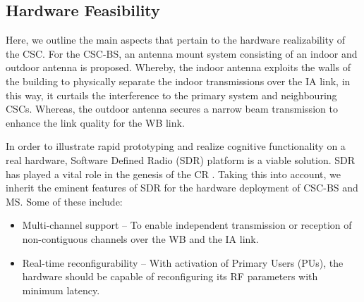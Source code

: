 \documentclass[draftcls, onecolumn, 11pt]{IEEEtran}
\begin{document}
\subsection*{Hardware Feasibility}
Here, we outline the main aspects that pertain to the hardware realizability of the CSC. For the CSC-BS, an antenna mount system consisting of an indoor and outdoor antenna is proposed. Whereby, the indoor antenna exploits the walls of the building to physically separate the indoor transmissions over the IA link, in this way, it curtails the interference to the primary system and neighbouring CSCs.
Whereas, the outdoor antenna secures a narrow beam transmission to enhance the link quality for the WB link. 

In order to illustrate rapid prototyping and realize cognitive functionality on a real hardware, Software Defined Radio (SDR) platform is a viable solution. SDR has played a vital role in the genesis of the CR \cite{Jondral05}. Taking this into account, we inherit the eminent features of SDR for the hardware deployment of CSC-BS and MS. Some of these include:
\begin{itemize}
\item Multi-channel support -- To enable independent transmission or reception of non-contiguous channels over the WB and the IA link.
\item Real-time reconfigurability -- With activation of Primary Users (PUs), the hardware should be capable of reconfiguring its RF parameters with minimum latency. %
\end{itemize} 
 
\end{document}

